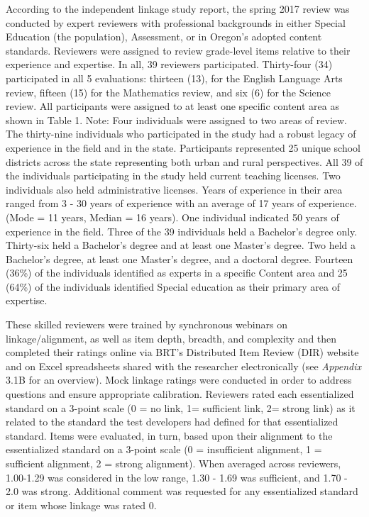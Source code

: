 \documentclass[]{article}
\begin{document}
According to the independent linkage study report, the spring 2017
review was conducted by expert reviewers with professional backgrounds
in either Special Education (the population), Assessment, or in Oregon's
adopted content standards. Reviewers were assigned to review grade-level
items relative to their experience and expertise. In all, 39 reviewers
participated. Thirty-four (34) participated in all 5 evaluations:
thirteen (13), for the English Language Arts review, fifteen (15) for
the Mathematics review, and six (6) for the Science review. All
participants were assigned to at least one specific content area as
shown in Table 1. Note: Four individuals were assigned to two areas of
review. The thirty-nine individuals who participated in the study had a
robust legacy of experience in the field and in the state. Participants
represented 25 unique school districts across the state representing
both urban and rural perspectives. All 39 of the individuals
participating in the study held current teaching licenses. Two
individuals also held administrative licenses. Years of experience in
their area ranged from 3 - 30 years of experience with an average of 17
years of experience. (Mode = 11 years, Median = 16 years). One
individual indicated 50 years of experience in the field. Three of the
39 individuals held a Bachelor's degree only. Thirty-six held a
Bachelor's degree and at least one Master's degree. Two held a
Bachelor's degree, at least one Master's degree, and a doctoral degree.
Fourteen (36\%) of the individuals identified as experts in a specific
Content area and 25 (64\%) of the individuals identified Special
education as their primary area of expertise.

These skilled reviewers were trained by synchronous webinars on
linkage/alignment, as well as item depth, breadth, and complexity and
then completed their ratings online via BRT's Distributed Item Review
(DIR) website and on Excel spreadsheets shared with the researcher
electronically (see \emph{Appendix} 3.1B for an overview). Mock linkage
ratings were conducted in order to address questions and ensure
appropriate calibration. Reviewers rated each essentialized standard on
a 3-point scale (0 = no link, 1= sufficient link, 2= strong link) as it
related to the standard the test developers had defined for that
essentialized standard. Items were evaluated, in turn, based upon their
alignment to the essentialized standard on a 3-point scale (0 =
insufficient alignment, 1 = sufficient alignment, 2 = strong alignment).
When averaged across reviewers, 1.00-1.29 was considered in the low
range, 1.30 - 1.69 was sufficient, and 1.70 - 2.0 was strong. Additional
comment was requested for any essentialized standard or item whose
linkage was rated 0.
\end{document}
